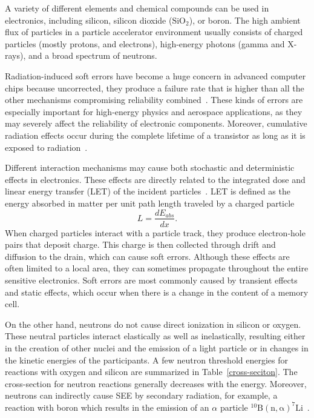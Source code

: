 A variety of different elements and chemical compounds can be used in electronics, including silicon, silicon dioxide ($\mathrm{SiO}_{2}$), or boron. The high ambient flux of particles in a particle accelerator environment usually consists of charged particles (mostly protons, and electrons), high-energy photons (gamma and X-rays), and a broad spectrum of neutrons.

 Radiation-induced soft errors have become a huge concern in advanced computer chips because uncorrected, they produce a failure rate that is higher than all the other mechanisms compromising reliability combined~\cite{1545891}. These kinds of errors are especially important for high-energy physics and aerospace applications, as they may severely affect the reliability of electronic components. Moreover, cumulative radiation effects occur during the complete lifetime of a transistor as long as it is exposed to radiation~\cite{RodriguezRodriguez2020}.

Different interaction mechanisms may cause both stochastic and deterministic effects in electronics. These effects are directly related to the integrated dose and linear energy transfer (\gls{LET}) of the incident particles~\cite{electronic_system_on_module}.  LET is defined as the energy absorbed in matter per unit path length traveled by a charged particle
\begin{equation}
    L = \frac{dE_{abs}}{dx}.
\end{equation}
When charged particles interact with a particle track, they produce electron-hole pairs that deposit charge. This charge is then collected through drift and diffusion to the drain, which can cause soft errors. Although these effects are often limited to a local area, they can sometimes propagate throughout the entire sensitive electronics. Soft errors are most commonly caused by transient effects and static effects, which occur when there is a change in the content of a memory cell.

On the other hand, neutrons do not cause direct ionization in silicon or oxygen. These neutral particles interact elastically as well as inelastically, resulting either in the creation of other nuclei and the emission of a light particle or in changes in the kinetic energies of the participants. A few neutron threshold energies for reactions with oxygen and silicon are summarized in Table~\ref{cross-seciton}. The cross-section for neutron reactions generally decreases with the energy. Moreover, neutrons can indirectly cause \gls{SEE} by secondary radiation, for example, a reaction with boron which results in the emission of an $\alpha$ particle $\mathrm{^{10}B(n,\alpha)^{7}Li}$~\cite{1545891,neutrons_energy,neutrons_energy_2}. 

